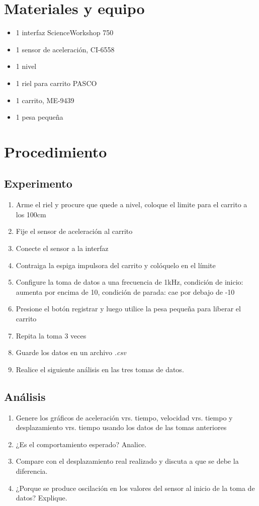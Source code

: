 \documentclass[12pt,letterpaper]{report}
\newcommand{\mat}{Materiales y equipo}
\newcommand{\pro}{Procedimiento}
\begin{document}
\section{\mat}
\begin{itemize}
\item 1 interfaz ScienceWorkshop\,\textregistered\,750
\item 1 sensor de aceleración, CI-6558
\item 1 nivel
\item 1 riel para carrito PASCO
\item 1 carrito, ME-9439
\item 1 pesa pequeña
\end{itemize}


\section{\pro}
\subsection{Experimento}
\begin{enumerate}
    
    \item Arme el riel y procure que quede a nivel, coloque el limite para el carrito a los 100cm
    \item Fije el sensor de aceleración al carrito
    \item Conecte el sensor a la interfaz
    \item Contraiga la espiga impulsora del carrito y colóquelo en el límite
    \item Configure la toma de datos a una frecuencia de 1kHz, condición de inicio: aumenta por encima de 10, condición de parada: cae por debajo de -10 
    \item Presione el botón registrar y luego utilice la pesa pequeña para liberar el carrito
    \item Repita la toma 3 veces 
    \item Guarde los datos en un archivo \emph{.csv}
    \item Realice el siguiente análisis en las tres tomas de datos.
\end{enumerate}


\subsection{Análisis}
\begin{enumerate}
    \item Genere los gráficos de aceleración vrs. tiempo, velocidad vrs. tiempo y desplazamiento vrs. tiempo usando los datos de las tomas anteriores
    \item ¿Es el comportamiento esperado? Analice.
    \item Compare con el desplazamiento real realizado y discuta a que se debe la diferencia. 
    \item ¿Porque se produce oscilación en los valores del sensor al inicio de la toma de datos? Explique. 
\end{enumerate}
\end{document}
